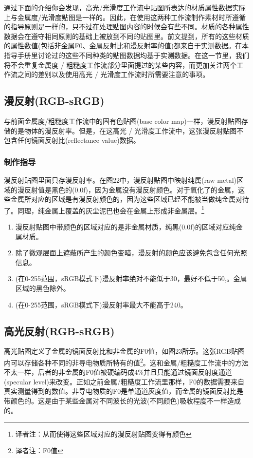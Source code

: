 通过下面的介绍你会发现，高光/光滑度工作流中贴图所表达的材质属性数据实际上与金属度/光滑度贴图是一样的。因此，在使用这两种工作流制作素材时所遵循的指导原则是一样的，只不过在处理贴图内容的时候会有些不同。材质的各种属性数据会在遵守相同原则的基础上被放到不同的贴图里。前文提到，所有的这些材质的属性数值(包括非金属F0、金属反射比和漫反射率的值)都来自于实测数据。在本指导手册里讨论过的这些不同种类的贴图数据均基于实测数据。在这一节里，我们将不会重复金属度 / 粗糙度工作流部分里面提过的某些内容，而更加关注两个工作流之间的差别以及使用高光 / 光滑度工作流时所需要注意的事项。

\subsection{漫反射(RGB-sRGB)}

与前面金属度/粗糙度工作流中的固有色贴图(base color map)一样，漫反射贴图存储的是物体的漫反射率。但是，在这高光 / 光滑度工作流中，这张漫反射贴图不包含任何镜面反射比(reflectance value)数据。

\subsubsection{制作指导}

漫反射贴图里面只存漫反射率。在图22中，漫反射贴图中映射纯属(raw metal)区域的漫反射值是黑色的(0.0f)，因为金属没有漫反射颜色。对于氧化了的金属，这些金属所对应的区域是有漫反射颜色的，因为这些区域已经不能被当做纯金属对待了。同理，纯金属上覆盖的灰尘泥巴也会在金属上形成非金属层。\footnote{译者注：从而使得这些区域对应的漫反射贴图变得有颜色}

\begin{enumerate}
\item 漫反射贴图中带颜色的区域对应的是非金属材质，纯黑(0.0f)的区域对应纯金属材质。
\item 除了微观层面上遮蔽所产生的颜色变暗，漫反射的颜色应该避免包含任何光照信息。
\item (在0-255范围，sRGB模式下)漫反射率绝对不能低于30，最好不低于50,。金属区域的黑色除外。
\item (在0-255范围，sRGB模式下)漫反射率最大不能高于240。
\end{enumerate}

\subsection{高光反射(RGB-sRGB)}

高光贴图定义了金属的镜面反射比和非金属的F0值，如图23所示。这张RGB贴图内可以存储各种不同的非导电物质所特有的值\footnote{译者注：F0值}。这和金属/粗糙度工作流中的方法不太一样，后者的非金属的F0值被硬编码成4\%并且只能通过镜面反射度通道(specular level)来改变。正如之前金属/粗糙度工作流里那样，F0的数据需要来自真实测量得到的数值。非导电物质的F0是单通道灰度值，而金属的镜面反射比是带颜色的。这是由于某些金属对不同波长的光波(不同颜色)吸收程度不一样造成的。

